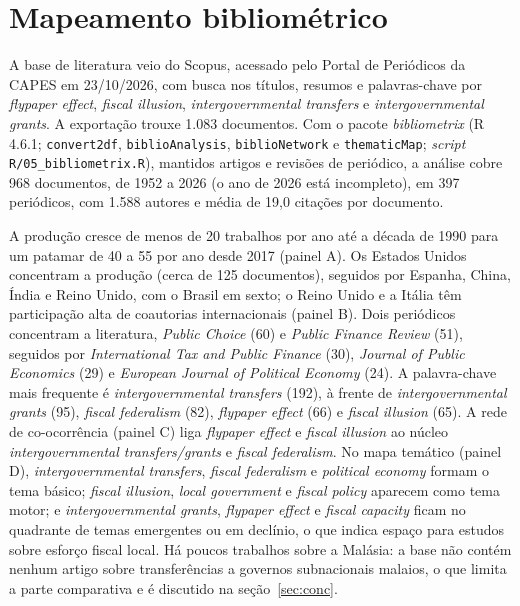 \documentclass[10pt,twocolumn]{article}
\begin{document}
\section{Mapeamento bibliométrico}\label{sec:biblio}
A base de literatura veio do Scopus, acessado pelo Portal de Periódicos da CAPES em 23/10/2026, com busca nos títulos, resumos e palavras-chave por \textit{flypaper effect}, \textit{fiscal illusion}, \textit{intergovernmental transfers} e \textit{intergovernmental grants}. A exportação trouxe 1.083 documentos. Com o pacote \textit{bibliometrix} (R 4.6.1; \texttt{convert2df}, \texttt{biblioAnalysis}, \texttt{biblioNetwork} e \texttt{thematicMap}; \textit{script} \texttt{R/05\_bibliometrix.R}), mantidos artigos e revisões de periódico, a análise cobre 968 documentos, de 1952 a 2026 (o ano de 2026 está incompleto), em 397 periódicos, com 1.588 autores e média de 19,0 citações por documento.

A produção cresce de menos de 20 trabalhos por ano até a década de 1990 para um patamar de 40 a 55 por ano desde 2017 (painel A). Os Estados Unidos concentram a produção (cerca de 125 documentos), seguidos por Espanha, China, Índia e Reino Unido, com o Brasil em sexto; o Reino Unido e a Itália têm participação alta de coautorias internacionais (painel B). Dois periódicos concentram a literatura, \textit{Public Choice} (60) e \textit{Public Finance Review} (51), seguidos por \textit{International Tax and Public Finance} (30), \textit{Journal of Public Economics} (29) e \textit{European Journal of Political Economy} (24). A palavra-chave mais frequente é \textit{intergovernmental transfers} (192), à frente de \textit{intergovernmental grants} (95), \textit{fiscal federalism} (82), \textit{flypaper effect} (66) e \textit{fiscal illusion} (65). A rede de co-ocorrência (painel C) liga \textit{flypaper effect} e \textit{fiscal illusion} ao núcleo \textit{intergovernmental transfers/grants} e \textit{fiscal federalism}. No mapa temático (painel D), \textit{intergovernmental transfers}, \textit{fiscal federalism} e \textit{political economy} formam o tema básico; \textit{fiscal illusion}, \textit{local government} e \textit{fiscal policy} aparecem como tema motor; e \textit{intergovernmental grants}, \textit{flypaper effect} e \textit{fiscal capacity} ficam no quadrante de temas emergentes ou em declínio, o que indica espaço para estudos sobre esforço fiscal local. Há poucos trabalhos sobre a Malásia: a base não contém nenhum artigo sobre transferências a governos subnacionais malaios, o que limita a parte comparativa e é discutido na seção~\ref{sec:conc}.
\end{document}
